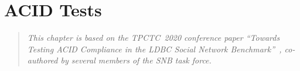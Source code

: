 \chapter{ACID Tests}
\label{sec:acid}

\newcommand{\bl}[1]{\textcolor{blue}{#1}}
\newcommand{\rd}[1]{\textcolor{red}{#1}}
\newcommand{\gn}[1]{\textcolor{green}{#1}}
\newcommand{\gy}[1]{\textcolor{grey}{\textit{#1}}}

\newcommand{\level}[1]{\textsf{#1}}
\newcommand{\anomaly}[1]{\rd{#1}}
\newcommand{\anolong}[1]{\emph{\rd{#1}}}
\newcommand{\tx}[1]{#1}

\newcommand{\cmark}{\ding{51}}
\newcommand{\xmark}{\ding{55}}


\begin{quote}
  \textit{This chapter is based on the TPCTC~2020 conference paper ``Towards Testing ACID Compliance in the LDBC Social Network Benchmark''~\cite{DBLP:conf/tpctc/WaudbySKMBS20}, co-authored by several members of the SNB task force.}
\end{quote}

